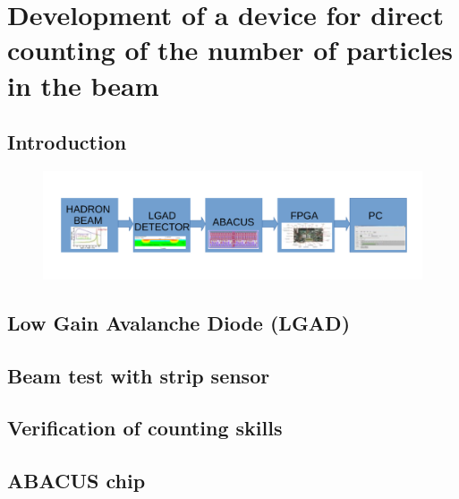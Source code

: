 \chapter{Development of a device for direct counting of the number of particles in the beam}

\section{Introduction}

\begin{figure}[H]
	\centering
	\includegraphics[width=0.99\linewidth]{IMG/ch2/BLOCK}
	\caption{}
	\label{fig:block}
\end{figure}

\section{Low Gain Avalanche Diode (LGAD)}

\section{Beam test with strip sensor}

\section{Verification of counting skills}

\section{ABACUS chip}

